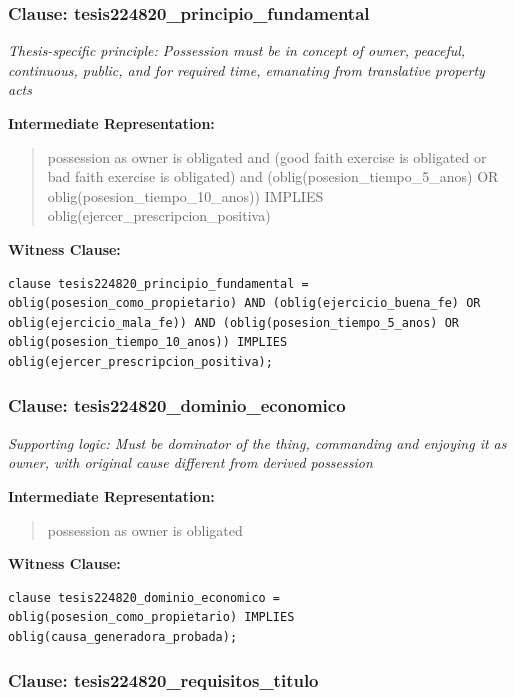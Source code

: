 \documentclass[11pt,a4paper]{article}
\begin{document}
\subsubsection{Clause: tesis224820\_principio\_fundamental}

\textit{Thesis-specific principle: Possession must be in concept of owner, peaceful, continuous, public, and for required time, emanating from translative property acts}

\textbf{Intermediate Representation:}

\begin{quote}
possession as owner is obligated and (good faith exercise is obligated or bad faith exercise is obligated) and (oblig(posesion\_tiempo\_5\_anos) OR oblig(posesion\_tiempo\_10\_anos)) IMPLIES oblig(ejercer\_prescripcion\_positiva)
\end{quote}

\textbf{Witness Clause:}

\begin{lstlisting}[style=witnessstyle, language=Witness]
clause tesis224820_principio_fundamental = oblig(posesion_como_propietario) AND (oblig(ejercicio_buena_fe) OR oblig(ejercicio_mala_fe)) AND (oblig(posesion_tiempo_5_anos) OR oblig(posesion_tiempo_10_anos)) IMPLIES oblig(ejercer_prescripcion_positiva);
\end{lstlisting}

\subsubsection{Clause: tesis224820\_dominio\_economico}

\textit{Supporting logic: Must be dominator of the thing, commanding and enjoying it as owner, with original cause different from derived possession}

\textbf{Intermediate Representation:}

\begin{quote}
possession as owner is obligated
\end{quote}

\textbf{Witness Clause:}

\begin{lstlisting}[style=witnessstyle, language=Witness]
clause tesis224820_dominio_economico = oblig(posesion_como_propietario) IMPLIES oblig(causa_generadora_probada);
\end{lstlisting}

\subsubsection{Clause: tesis224820\_requisitos\_titulo}
\end{document}
